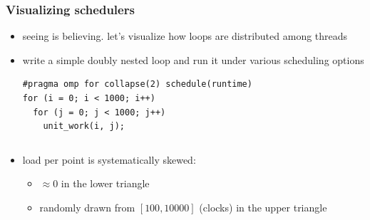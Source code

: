 \documentclass[12pt,dvipdfmx]{beamer}
\begin{document}
\begin{frame}[fragile]
\frametitle{Visualizing schedulers}
\begin{itemize}
\item seeing is believing. let's visualize how loops are distributed among threads
\item write a simple doubly nested loop and run it under various scheduling options
\begin{lstlisting}
#pragma omp for collapse(2) schedule(runtime)
for (i = 0; i < 1000; i++)
  for (j = 0; j < 1000; j++)
    unit_work(i, j);
\end{lstlisting}
\end{itemize}


\begin{columns}
\begin{column}{0.6\textwidth}
\begin{itemize}
\item load per point is systematically skewed:
  \begin{itemize}
  \item $\approx 0$ in the lower triangle
  \item randomly drawn from $[100,10000]$ (clocks) in the upper triangle
  \end{itemize}
\end{itemize}  
\end{column}

\begin{column}{0.4\textwidth}
\begin{center}
\def\svgwidth{\textwidth}
{\scriptsize }
\end{center}
\end{column}
\end{columns}
\end{frame}
\end{document}
